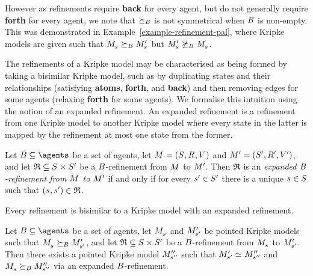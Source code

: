 However as refinements require {\bf back} for every agent, but do not generally require {\bf forth} for every agent, we note that $\succeq_{B}$ is not symmetrical when $B$ is non-empty.
This was demonstrated in Example~\ref{example-refinement-pal}, where Kripke models are given such that  $\kPModel{\kStateS} \simulatesBs \kPModelP{\kStateS}$ but $\kPModelP{\kStateS} \not\simulatesBs \kPModel{\kStateS}$.

The refinements of a Kripke model may be characterised as being formed by taking a bisimilar Kripke model, such as by duplicating states and their relationships (satisfying {\bf atoms}, {\bf forth}, and {\bf back}) and then removing edges for some agents (relaxing {\bf forth} for some agents).
We formalise this intuition using the notion of an expanded refinement.
An expanded refinement is a refinement from one Kripke model to another Kripke model where every state in the latter is mapped by the refinement at most one state from the former.

\pagebreak

\begin{definition}\label{expanded-refinement}
Let $\agentsB \subseteq \agents$ be a set of agents, let $\kModelAndTuple$ and $\kModelAndTupleP$, and let $\refinement \subseteq \kStates \times \kStatesP$ be a $B$-refinement from $\kModel$ to ${M^{\prime}_{}}$.
Then $\mathfrak{R}$ is an {\em expanded $B$-refinement from $\kModel$ to ${M^{\prime}_{}}$} if and only if for every ${s}^{\prime} \in {S^{\prime}}$ there is a unique $\kStateS \in \kStates$ such that $(\kStateS, \kStateSP) \in \refinement$.
\end{definition}

Every refinement is bisimilar to a Kripke model with an expanded refinement.

\begin{lemma}\label{refinement-expansion}
Let $\agentsB \subseteq \agents$ be a set of agents, let $\kPModel{\kStateS}$ and ${M^{\prime}_{{s}^{\prime}}}$ be pointed Kripke models such that $\kPModel{\kStateS} \simulatesBs \kPModelP{\kStateSP}$, and let $\refinement \subseteq \kStates \times \kStatesP$ be a $B$-refinement from $\kPModel{\kStateS}$ to ${M^{\prime}_{{s}^{\prime}}}$.
Then there exists a pointed Kripke model ${M^{\prime\prime}_{{s}^{\prime\prime}}}$ such that $\kPModelP{\kStateSP} \bisimilar \kPModelPP{\kStateSPP}$ and $\kPModel{\kStateS} \simulatesBs \kPModelPP{\kStateSPP}$ via an expanded $B$-refinement.
\end{lemma}

